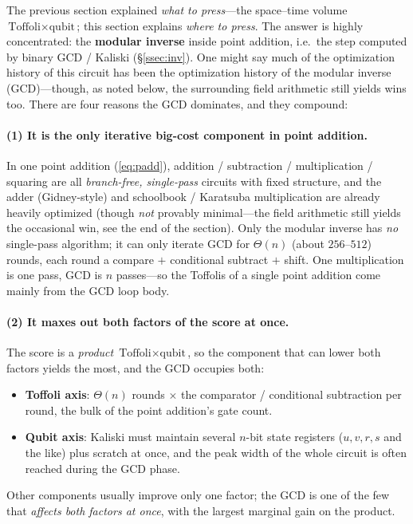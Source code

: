 \documentclass[11pt]{article}
\newcommand{\secref}[1]{\hyperref[#1]{\S\ref*{#1}}}
\begin{document}
The previous section explained \emph{what to press}---the space--time volume $\text{Toffoli}\times\text{qubit}$; this section explains \emph{where to press}. The answer is highly
concentrated: the \textbf{modular inverse} inside point addition, i.e.\ the step computed by binary GCD / Kaliski (\secref{ssec:inv}). One might say
much of the optimization history of this circuit has been the optimization history of the modular inverse (GCD)---though, as noted below, the surrounding field arithmetic still yields wins too. There are four reasons the GCD dominates, and they compound:

\paragraph{(1) It is the only iterative big-cost component in point addition.}
In one point addition (\eqref{eq:padd}), addition / subtraction / multiplication / squaring are all \emph{branch-free, single-pass} circuits with fixed structure, and the adder (Gidney-style) and
schoolbook / Karatsuba multiplication are already heavily optimized (though \emph{not} provably minimal---the field arithmetic still yields the occasional win, see the end of the section). Only the modular inverse has \emph{no} single-pass algorithm; it can only iterate GCD for
$\Theta(n)$ (about $256$--$512$) rounds, each round a compare $+$ conditional subtract $+$ shift. One multiplication is one pass, GCD is $n$ passes---so
the Toffolis of a single point addition come mainly from the GCD loop body.

\paragraph{(2) It maxes out both factors of the score at once.}
The score is a \emph{product} $\text{Toffoli}\times\text{qubit}$, so the component that can lower both factors yields the most, and the GCD occupies both:
\begin{itemize}[leftmargin=1.4em]
\item \textbf{Toffoli axis}: $\Theta(n)$ rounds $\times$ the comparator / conditional subtraction per round, the bulk of the point addition's gate count.
\item \textbf{Qubit axis}: Kaliski must maintain several $n$-bit state registers ($u,v,r,s$ and the like) plus scratch at once, and the peak width of the whole
circuit is often reached during the GCD phase.
\end{itemize}
Other components usually improve only one factor; the GCD is one of the few that \emph{affects both factors at once}, with the largest marginal gain on the product.
\end{document}
